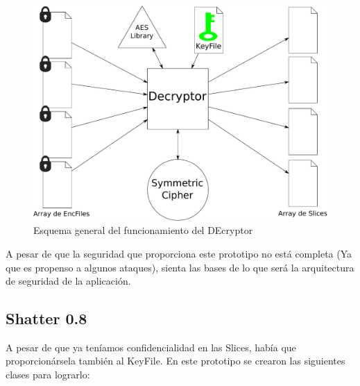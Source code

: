\begin{figure}[ht]
  \centering
  \includegraphics[scale=0.5]{Figures/Decryptor}
  \decoRule
  \caption[Decryptor]{Esquema general del funcionamiento del DEcryptor}
  \label{fig:Decryptor}
\end{figure}

A pesar de que la seguridad que proporciona este prototipo no está completa (Ya
que es propenso a algunos ataques), sienta las bases de lo que será
la arquitectura de seguridad de la aplicación.

\subsection{Shatter 0.8}

A pesar de que ya teníamos confidencialidad en las Slices, había que
proporcionársela también al KeyFile. En este prototipo se crearon las siguientes
clases para lograrlo:

